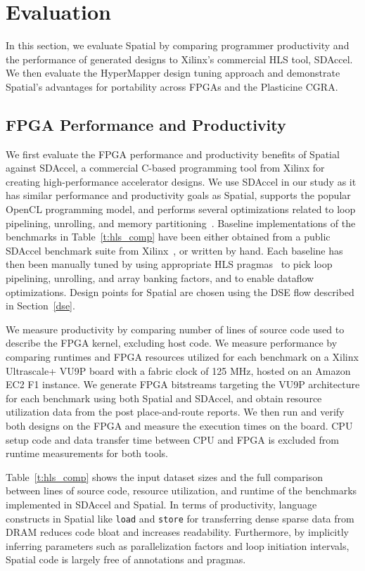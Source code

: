 \section{Evaluation}
\label{evaluation}

In this section, we evaluate Spatial by comparing programmer productivity and the performance of generated designs to Xilinx's commercial HLS tool, SDAccel. We then evaluate the HyperMapper design tuning approach and demonstrate Spatial's advantages for portability across FPGAs and the Plasticine CGRA.

\subsection{FPGA Performance and Productivity}
We first evaluate the FPGA performance and productivity benefits of Spatial against SDAccel, a commercial C-based programming tool from Xilinx for creating high-performance accelerator designs. We use SDAccel in our study as it has similar performance and productivity goals as Spatial, supports the popular OpenCL programming model, and performs several optimizations related to loop pipelining, unrolling, and memory partitioning~\cite{sdaccel}. Baseline implementations of the benchmarks in Table~\ref{t:hls_comp} have been either obtained from a public SDAccel benchmark suite from Xilinx~\cite{sdaccelBench}, or written by hand. Each baseline has then been manually tuned by using appropriate HLS pragmas~\cite{hlsPragmaRef} to pick loop pipelining, unrolling, and array banking factors, and to enable dataflow optimizations. Design points for Spatial are chosen using the DSE flow described in Section~\ref{dse}.

We measure productivity by comparing number of lines of source code used to describe the FPGA kernel, excluding host code. We measure performance by comparing runtimes and FPGA resources utilized for each benchmark on a Xilinx Ultrascale+ VU9P board with a fabric clock of 125 MHz, hosted on an Amazon EC2 F1 instance. We generate FPGA bitstreams targeting the VU9P architecture for each benchmark using both Spatial and SDAccel, and obtain resource utilization data from the post place-and-route reports. We then run and verify both designs on the FPGA and measure the execution times on the board. CPU setup code and data transfer time between CPU and FPGA is excluded from runtime measurements for both tools.

Table~\ref{t:hls_comp} shows the input dataset sizes and the full comparison between lines of source code, resource utilization, and runtime of the benchmarks implemented in SDAccel and Spatial.
In terms of productivity, language constructs in Spatial like \texttt{\small{load}} and \texttt{\small{store}} for transferring dense sparse data from DRAM reduces code bloat and increases readability.
Furthermore, by implicitly
inferring parameters such as parallelization factors and loop initiation intervals, Spatial code is largely free of annotations and pragmas.

